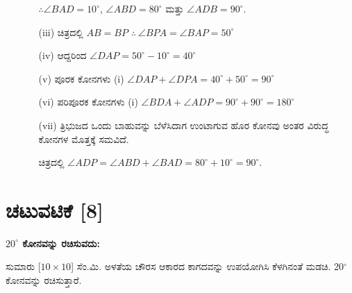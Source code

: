\begin{enumerate}
\begin{itemize}
$\therefore \angle BAD = 10^\circ$, $\angle ABD = 80^\circ$ ಮತ್ತು $\angle ADB = 90^\circ$.

\item[(iii)] ಚಿತ್ರದಲ್ಲಿ $AB = BP$ \quad $\therefore ~ \angle BPA = \angle BAP = 50^\circ$

\item[(iv)] ಆದ್ದರಿಂದ $\angle DAP = 50^\circ - 10^\circ = 40^\circ$

\item[(v)] ಪೂರಕ ಕೋನಗಳು (i) $\angle DAP + \angle DPA = 40^\circ + 50^\circ = 90^\circ$

\item[(vi)] ಪರಿಪೂರಕ ಕೋನಗಳು  (i) $\angle BDA + \angle ADP = 90^\circ + 90^\circ = 180^\circ $

\item[(vii)] ತ್ರಿಭುಜದ ಒಂದು ಬಾಹುವನ್ನು ಬೆಳೆಸಿದಾಗ ಉಂಟಾಗುವ ಹೊರ ಕೋನವು ಅಂತರ ವಿರುದ್ಧ ಕೋನಗಳ ಮೊತ್ತಕ್ಕೆ ಸಮವಿದೆ. 

ಚಿತ್ರದಲ್ಲಿ $\angle ADP = \angle ABD + \angle BAD = 80^\circ + 10^\circ = 90^\circ$.
\end{itemize}
\end{enumerate}

\section*{ಚಟುವಟಿಕೆ [8]} \textbf{$20^\circ$ ಕೋನವನ್ನು ರಚಿಸುವದು: }

ಸುಮಾರು [$10 \times 10$] ಸೆಂ.ಮಿ. ಅಳತೆಯ ಚೌರಸ ಆಕಾರದ ಕಾಗದವನ್ನು ಉಪಯೋಗಿಸಿ ಕೆಳಗಿನಂತೆ ಮಡಚಿ.  20$^\circ$ ಕೋನವನ್ನು ರಚಿಸುತ್ತಾರೆ. 

